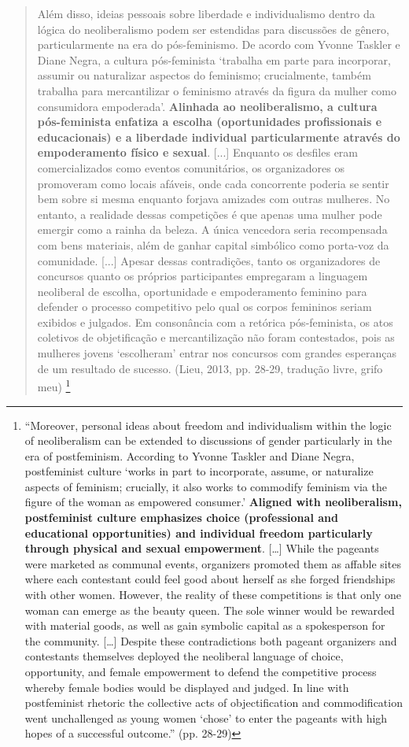 \begin{quote}
    Além disso, ideias pessoais sobre liberdade e individualismo dentro da lógica do neoliberalismo podem ser estendidas para discussões de gênero, particularmente na era do pós-feminismo. De acordo com Yvonne Taskler e Diane Negra, a cultura pós-feminista ‘trabalha em parte para incorporar, assumir ou naturalizar aspectos do feminismo; crucialmente, também trabalha para mercantilizar o feminismo através da figura da mulher como consumidora empoderada’. \textbf{Alinhada ao neoliberalismo, a cultura pós-feminista enfatiza a escolha (oportunidades profissionais e educacionais) e a liberdade individual particularmente através do empoderamento físico e sexual}. [...] Enquanto os desfiles eram comercializados como eventos comunitários, os organizadores os promoveram como locais afáveis, onde cada concorrente poderia se sentir bem sobre si mesma enquanto forjava amizades com outras mulheres. No entanto, a realidade dessas competições é que apenas uma mulher pode emergir como a rainha da beleza. A única vencedora seria recompensada com bens materiais, além de ganhar capital simbólico como porta-voz da comunidade. [...] Apesar dessas contradições, tanto os organizadores de concursos quanto os próprios participantes empregaram a linguagem neoliberal de escolha, oportunidade e empoderamento feminino para defender o processo competitivo pelo qual os corpos femininos seriam exibidos e julgados. Em consonância com a retórica pós-feminista, os atos coletivos de objetificação e mercantilização não foram contestados, pois as mulheres jovens ‘escolheram’ entrar nos concursos com grandes esperanças de um resultado de sucesso. (Lieu, 2013, pp. 28-29, tradução livre, grifo meu) \footnote{``Moreover, personal ideas about freedom and individualism within the logic of neoliberalism can be extended to discussions of gender particularly in the era of postfeminism. According to Yvonne Taskler and Diane Negra, postfeminist culture ‘works in part to incorporate, assume, or naturalize aspects of feminism; crucially, it also works to commodify feminism via the figure of the woman as empowered consumer.’ \textbf{Aligned with neoliberalism, postfeminist culture emphasizes choice (professional and educational opportunities) and individual freedom particularly through physical and sexual empowerment}. […] While the pageants were marketed as communal events, organizers promoted them as affable sites where each contestant could feel good about herself as she forged friendships with other women. However, the reality of these competitions is that only one woman can emerge as the beauty queen. The sole winner would be rewarded with material goods, as well as gain symbolic capital as a spokesperson for the community. […] Despite these contradictions both pageant organizers and contestants themselves deployed the neoliberal language of choice, opportunity, and female empowerment to defend the competitive process whereby female bodies would be displayed and judged. In line with postfeminist rhetoric the collective acts of objectification and commodification went unchallenged as young women ‘chose’ to enter the pageants with high hopes of a successful outcome.'' (pp. 28-29)}
\end{quote}

